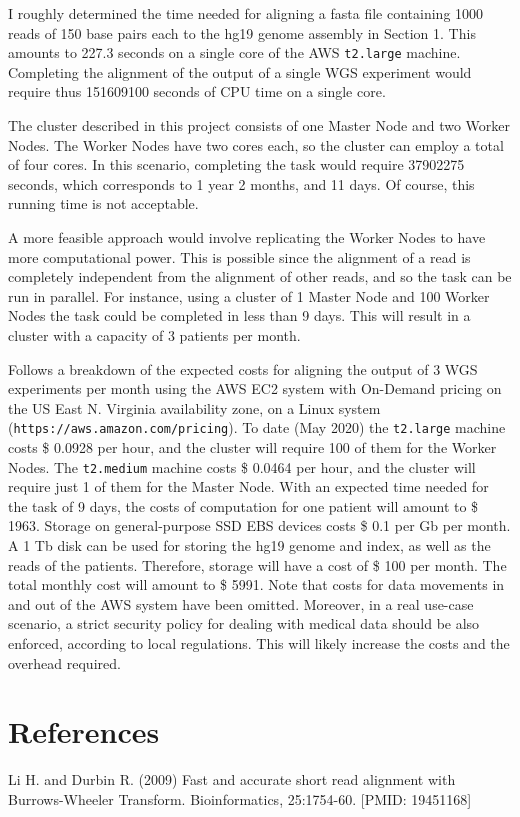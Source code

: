 \documentclass{article}
\begin{document}
I roughly determined the time needed for aligning a fasta file containing 1000 reads of 150 base pairs each to the hg19 genome assembly in Section 1.
This amounts to 227.3 seconds on a single core of the AWS \texttt{t2.large} machine.
Completing the alignment of the output of a single WGS experiment would require thus 151609100 seconds of CPU time on a single core.

The cluster described in this project consists of one Master Node and two Worker Nodes.
The Worker Nodes have two cores each, so the cluster can employ a total of four cores.
In this scenario, completing the task would require 37902275 seconds, which corresponds to 1 year 2 months, and 11 days.
Of course, this running time is not acceptable.

A more feasible approach would involve replicating the Worker Nodes to have more computational power.
This is possible since the alignment of a read is completely independent from the alignment of other reads, and so the task can be run in parallel.
For instance, using a cluster of 1 Master Node and 100 Worker Nodes the task could be completed in less than 9 days.
This will result in a cluster with a capacity of 3 patients per month.

Follows a breakdown of the expected costs for aligning the output of 3 WGS experiments per month using the AWS EC2 system with On-Demand pricing on the US East N. Virginia availability zone, on a Linux system (\texttt{https://aws.amazon.com/pricing}).
To date (May 2020) the \texttt{t2.large} machine costs \$ 0.0928 per hour, and the cluster will require 100 of them for the Worker Nodes.
The \texttt{t2.medium} machine costs \$ 0.0464 per hour, and the cluster will require just 1 of them for the Master Node.
With an expected time needed for the task of 9 days, the costs of computation for one patient will amount to \$ 1963.
Storage on general-purpose SSD EBS devices costs \$ 0.1 per Gb per month.
A 1 Tb disk can be used for storing the hg19 genome and index, as well as the reads of the patients.
Therefore, storage will have a cost of \$ 100 per month.
The total monthly cost will amount to \$ 5991.
Note that costs for data movements in and out of the AWS system have been omitted.
Moreover, in a real use-case scenario, a strict security policy for dealing with medical data should be also enforced, according to local regulations.
This will likely increase the costs and the overhead required.

\section{References}
Li H. and Durbin R. (2009) Fast and accurate short read alignment with Burrows-Wheeler Transform. Bioinformatics, 25:1754-60. [PMID: 19451168]\\
\end{document}
